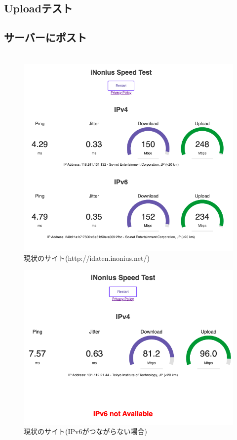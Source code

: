 \documentclass[rinkou,a4paper]{ieicej}
\begin{document}
\subsection{Uploadテスト}

\subsection{サーバーにポスト}

\section{}

\begin{figure}[p]
\centering
\includegraphics[scale = 0.3]{Screenshot.png}
\caption{現状のサイト(http://idaten.inonius.net/)}\label{ss}
\end{figure}

\begin{figure}[p]
\centering
\includegraphics[scale = 0.3]{Screenshot2.png}
\caption{現状のサイト(IPv6がつながらない場合)}\label{ss}
\end{figure}
\end{document}
